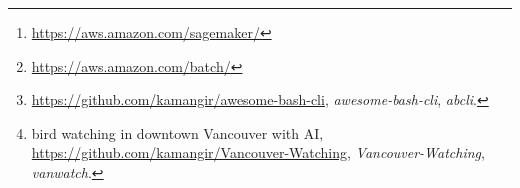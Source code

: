 \begin{abstract}
wip

In this paper, we discuss the Mathematics of building Machine Vision AI systems in Linux. We review the general challenge of translating the description of an AI operation in human language into a human-readable, machine-executable script. We select multiple Machine Vision AI challenges that we first describe in human language. Then, in each case, we build the language to convert the description in human language into one or more scripts we execute on machines. We use AWS SageMaker~\footnote{\url{https://aws.amazon.com/sagemaker/}} for development and training and AWS Batch~\footnote{\url{https://aws.amazon.com/batch/}} for inference and discuss API calls. The main contribution of this paper is a mathematical framework for building an AI language for a practical use-case in Machine Vision. We hope that researchers in other fields of AI use and extend this framework in their disciplines. We present a reference implementation~\footnote{\url{https://github.com/kamangir/awesome-bash-cli}, \emph{awesome-bash-cli}, \emph{abcli}.} of this framework and multiple use-cases~\footnote{bird watching in downtown Vancouver with AI, \url{https://github.com/kamangir/Vancouver-Watching}, \emph{Vancouver-Watching}, \emph{vanwatch}.} - \emph{revision-\revision}
\end{abstract}
